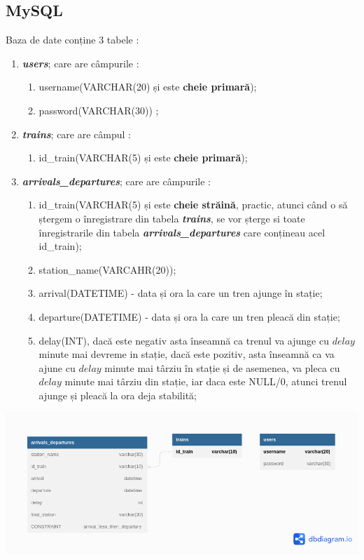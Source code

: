 \documentclass[runningheads]{llncs}
\begin{document}
\subsection{MySQL}
Baza de date conține 3 tabele :
\begin{enumerate}
    \itemsep0em
    \item \textbf{\textit{users}}; care are câmpurile :
    \begin{enumerate}
        \itemsep0em
        \item username(VARCHAR(20) și este \textbf{cheie primară});
        \item password(VARCHAR(30)) ;
    \end{enumerate}
    \item \textbf{\textit{trains}}; care are câmpul : 
    \begin{enumerate}
        \itemsep0em
        \item id\_train(VARCHAR(5) și este \textbf{cheie primară});
    \end{enumerate}
    \item \textbf{\textit{arrivals\_departures}}; care are câmpurile :
    \begin{enumerate}
        \itemsep0em
        \item id\_train(VARCHAR(5) și este \textbf{cheie străină}, practic, atunci când o să ștergem o înregistrare din tabela \textbf{\textit{trains}}, se vor șterge si toate înregistrarile din tabela \textbf{\textit{arrivals\_departures}} care conțineau acel id\_train);
        \item station\_name(VARCAHR(20));
        \item arrival(DATETIME) - data și ora la care un tren ajunge în stație;
        \item departure(DATETIME) - data și ora la care un tren pleacă din stație;
        \item delay(INT), dacă este negativ asta înseamnă ca trenul va ajunge cu $delay$ minute mai devreme in stație, dacă este pozitiv, asta înseamnă ca va ajune cu $delay$ minute mai târziu în stație și de asemenea, va pleca cu $delay$ minute mai târziu din stație, iar daca este NULL/0, atunci trenul ajunge și pleacă la ora deja stabilită;
        \end{enumerate}
\end{enumerate}
 \begin{center}
		\includegraphics[scale=0.40]{database_diagram.png}
            
	\end{center}
\end{document}
